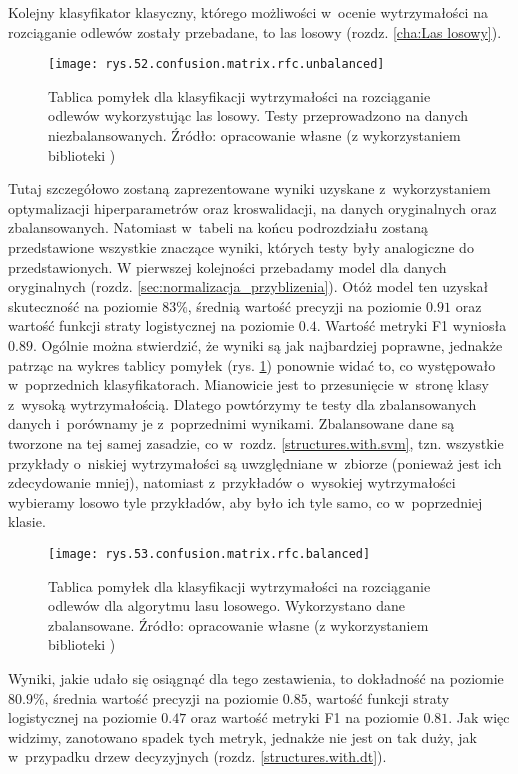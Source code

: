 Kolejny klasyfikator klasyczny, którego możliwości w~ocenie wytrzymałości na rozciąganie odlewów zostały przebadane, to las losowy (rozdz. \ref{cha:Las losowy}). 
\begin{figure}[h]
    \centering
    \texttt{[image: rys.52.confusion.matrix.rfc.unbalanced]}
    \caption{Tablica pomyłek dla klasyfikacji wytrzymałości na rozciąganie odlewów wykorzystując las losowy. Testy przeprowadzono na danych niezbalansowanych. Źródło: opracowanie własne (z wykorzystaniem biblioteki )}
    \label{rys.52.confusion.matrix.rfc.unbalanced}
\end{figure}
Tutaj szczegółowo zostaną zaprezentowane wyniki uzyskane z~wykorzystaniem optymalizacji hiperparametrów oraz kroswalidacji, na danych oryginalnych oraz zbalansowanych. Natomiast w~tabeli na końcu podrozdziału zostaną przedstawione wszystkie znaczące wyniki, których testy były analogiczne do przedstawionych. 
W pierwszej kolejności przebadamy model dla danych oryginalnych (rozdz. \ref{sec:normalizacja_przyblizenia}). Otóż model ten uzyskał skuteczność na poziomie $83\%$, średnią wartość precyzji na poziomie $0.91$ oraz wartość funkcji straty logistycznej na poziomie $0.4$. Wartość metryki F1 wyniosła $0.89$. Ogólnie można stwierdzić, że wyniki są jak najbardziej poprawne, jednakże patrząc na wykres tablicy pomyłek (rys. \ref{rys.52.confusion.matrix.rfc.unbalanced}) ponownie widać to, co występowało w~poprzednich klasyfikatorach. Mianowicie jest to przesunięcie w~stronę klasy z~wysoką wytrzymałością. Dlatego powtórzymy te testy dla zbalansowanych danych i~porównamy je z~poprzednimi wynikami. 
Zbalansowane dane są tworzone na tej samej zasadzie, co w~rozdz. \ref{structures.with.svm}, tzn. wszystkie przykłady o~niskiej wytrzymałości są uwzględniane w~zbiorze (ponieważ jest ich zdecydowanie mniej), natomiast z~przykładów o~wysokiej wytrzymałości wybieramy losowo tyle przykładów, aby było ich tyle samo, co w~poprzedniej klasie. 
\begin{figure}[h]
    \centering
    \texttt{[image: rys.53.confusion.matrix.rfc.balanced]}
    \caption{Tablica pomyłek dla klasyfikacji wytrzymałości na rozciąganie odlewów dla algorytmu lasu losowego. Wykorzystano dane zbalansowane. Źródło: opracowanie własne (z wykorzystaniem biblioteki )}
    \label{rys.53.confusion.matrix.rfc.balanced}
\end{figure}
Wyniki, jakie udało się osiągnąć dla tego zestawienia, to dokładność na poziomie $80.9\%$, średnia wartość precyzji na poziomie $0.85$, wartość funkcji straty logistycznej na poziomie $0.47$ oraz wartość metryki F1 na poziomie $0.81$. Jak więc widzimy, zanotowano spadek tych metryk, jednakże nie jest on tak duży, jak w~przypadku drzew decyzyjnych (rozdz. \ref{structures.with.dt}). 

